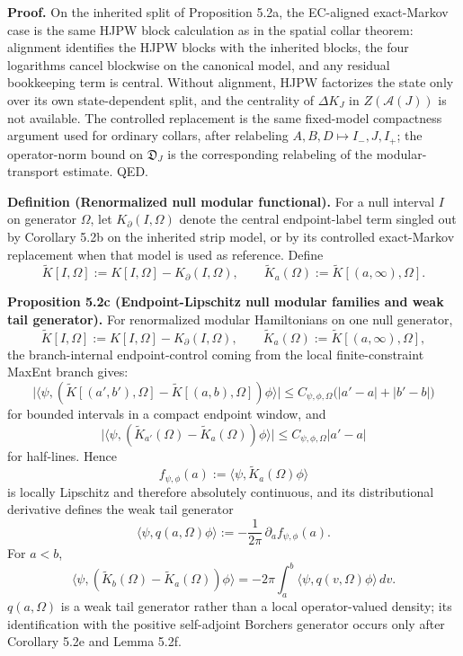 \textbf{Proof.} On the inherited split of Proposition 5.2a, the EC-aligned exact-Markov case is the same HJPW block calculation as in the spatial collar theorem: alignment identifies the HJPW blocks with the inherited blocks, the four logarithms cancel blockwise on the canonical model, and any residual bookkeeping term is central. Without alignment, HJPW factorizes the state only over its own state-dependent split, and the centrality of \(\Delta K_J\) in \(Z(\mathcal A(J))\) is not available. The controlled replacement is the same fixed-model compactness argument used for ordinary collars, after relabeling \(A,B,D\mapsto I_-,J,I_+\); the operator-norm bound on \(\mathfrak D_J\) is the corresponding relabeling of the modular-transport estimate. QED.

\textbf{Definition (Renormalized null modular functional).} For a null interval \(I\) on generator \(\Omega\), let \(K_\partial(I,\Omega)\) denote the central endpoint-label term singled out by Corollary 5.2b on the inherited strip model, or by its controlled exact-Markov replacement when that model is used as reference. Define
\[
\widetilde K[I,\Omega]
:=
K[I,\Omega]-K_\partial(I,\Omega),
\qquad
\widetilde K_a(\Omega):=\widetilde K[(a,\infty),\Omega].
\]

\textbf{Proposition 5.2c (Endpoint-Lipschitz null modular families and weak tail generator).} For renormalized modular Hamiltonians on one null generator,
\[
\widetilde K[I,\Omega]
:=
K[I,\Omega]-K_\partial(I,\Omega),
\qquad
\widetilde K_a(\Omega):=\widetilde K[(a,\infty),\Omega],
\]
the branch-internal endpoint-control coming from the local finite-constraint MaxEnt branch gives:
\[
\bigl|
\langle\psi,(\widetilde K[(a',b'),\Omega]-\widetilde K[(a,b),\Omega])\phi\rangle
\bigr|
\le
C_{\psi,\phi,\Omega}\bigl(|a'-a|+|b'-b|\bigr)
\]
for bounded intervals in a compact endpoint window, and
\[
\bigl|
\langle\psi,(\widetilde K_{a'}(\Omega)-\widetilde K_a(\Omega))\phi\rangle
\bigr|
\le
C_{\psi,\phi,\Omega}|a'-a|
\]
for half-lines. Hence
\[
f_{\psi,\phi}(a):=\langle\psi,\widetilde K_a(\Omega)\phi\rangle
\]
is locally Lipschitz and therefore absolutely continuous, and its distributional derivative defines the weak tail generator
\[
\langle\psi,q(a,\Omega)\phi\rangle
:=
-\frac{1}{2\pi}\,\partial_a f_{\psi,\phi}(a).
\]
For \(a<b\),
\[
\langle\psi,(\widetilde K_b(\Omega)-\widetilde K_a(\Omega))\phi\rangle
=
-2\pi\int_a^b \langle\psi,q(v,\Omega)\phi\rangle\,dv.
\]
\(q(a,\Omega)\) is a weak tail generator rather than a local operator-valued density; its identification with the positive self-adjoint Borchers generator occurs only after Corollary 5.2e and Lemma 5.2f.

